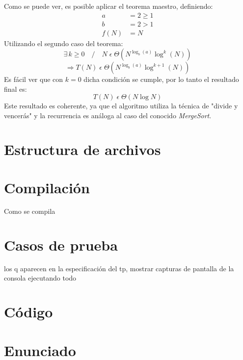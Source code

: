 \documentclass{article}
\begin{document}
      Como se puede ver, es posible aplicar el teorema maestro, definiendo:
    \begin{align*}
      a &= 2 \geq 1 \\
      b &= 2 > 1\\
   f(N) &= N
    \end{align*}
      Utilizando el segundo caso del teorema:
    $$ \exists\,k \geq 0 \quad / \quad N \;\epsilon\; \Theta (N^{\log_b (a)} \log^k (N)) $$
    $$ \Rightarrow T(N)\;\epsilon\;\Theta (N^{\log_b (a)} \log^{k+1} (N)) $$
      Es fácil ver que con $k=0$ dicha condición se cumple, por lo tanto
    el resultado final es:
    $$ \boxed{T(N)\;\epsilon\;\Theta (N \log N)} $$
      Este resultado es coherente, ya que el algoritmo utiliza la técnica de 
    "divide y vencerás" y la recurrencia es análoga al caso del conocido 
    \textit{MergeSort}.




\section{Estructura de archivos}

\section{Compilación}
Como se compila

\section{Casos de prueba}
los q aparecen en la especificación del tp, mostrar capturas de pantalla
de la consola ejecutando todo

\section{Código}


%    

\section{Enunciado}
\end{document}
